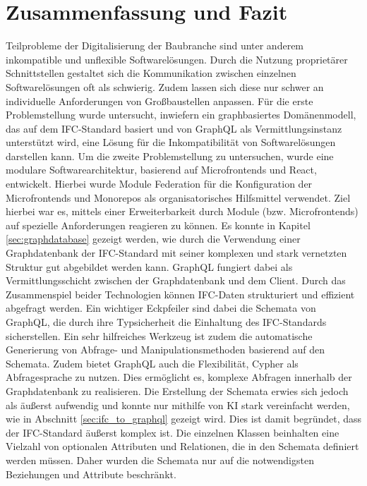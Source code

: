 \section{Zusammenfassung und Fazit}
\label{sec:zusammenfassung_fazit}
Teilprobleme der Digitalisierung der Baubranche sind unter anderem inkompatible und unflexible Softwarelösungen. Durch die Nutzung proprietärer Schnittstellen gestaltet sich die Kommunikation zwischen einzelnen Softwarelösungen oft als schwierig. Zudem lassen sich diese nur schwer an individuelle Anforderungen von Großbaustellen anpassen. Für die erste Problemstellung wurde untersucht, inwiefern ein graphbasiertes Domänenmodell, das auf dem IFC-Standard basiert und von GraphQL als Vermittlungsinstanz unterstützt wird, eine Lösung für die Inkompatibilität von Softwarelösungen darstellen kann. Um die zweite Problemstellung zu untersuchen, wurde
eine modulare Softwarearchitektur, basierend auf Microfrontends und React, entwickelt. Hierbei wurde Module Federation für die Konfiguration der Microfrontends und Monorepos als organisatorisches Hilfsmittel
verwendet. Ziel hierbei war es, mittels einer Erweiterbarkeit durch Module (bzw. Microfrontends) auf spezielle Anforderungen reagieren zu können. \newline
Es konnte in Kapitel \ref{sec:graphdatabase} gezeigt werden, wie durch die Verwendung einer Graphdatenbank der IFC-Standard mit seiner komplexen und stark vernetzten Struktur gut abgebildet werden kann. GraphQL fungiert dabei als Vermittlungsschicht
zwischen der Graphdatenbank und dem Client. Durch das Zusammenspiel beider Technologien können IFC-Daten strukturiert und effizient abgefragt werden. Ein wichtiger Eckpfeiler sind dabei die Schemata von GraphQL, die
durch ihre Typsicherheit die Einhaltung des IFC-Standards sicherstellen. Ein sehr hilfreiches Werkzeug ist zudem die automatische Generierung von Abfrage- und Manipulationsmethoden basierend auf den Schemata. Zudem bietet GraphQL auch die Flexibilität,
Cypher als Abfragesprache zu nutzen. Dies ermöglicht es, komplexe Abfragen innerhalb der Graphdatenbank zu realisieren. Die Erstellung der Schemata erwies sich jedoch als äußerst aufwendig und konnte nur mithilfe von KI stark vereinfacht werden, wie in Abschnitt \ref{sec:ifc_to_graphql} gezeigt wird.
Dies ist damit begründet, dass der IFC-Standard äußerst komplex ist. Die einzelnen Klassen beinhalten eine Vielzahl von optionalen Attributen und Relationen, die in den Schemata definiert werden müssen. Daher wurden die Schemata nur auf die notwendigsten Beziehungen und Attribute beschränkt.
